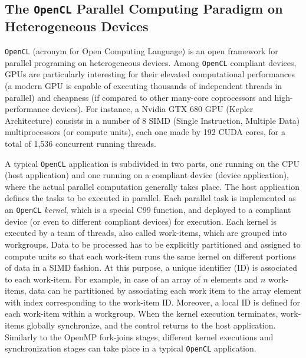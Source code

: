     \subsection{The \texttt{OpenCL} Parallel Computing Paradigm on Heterogeneous Devices}
    \texttt{OpenCL} (acronym for Open Computing Language) is an open framework for parallel programing on heterogeneous devices. Among \texttt{OpenCL} compliant devices, GPUs are particularly interesting for their elevated
    computational performances (a modern GPU is capable of executing
    thousands of independent threads in parallel) and cheapness (if
    compared to other many-core coprocessors and high-performance
    devices). For instance, a Nvidia GTX 680 GPU (Kepler Architecture)
    consists in a number of 8 SIMD (Single Instruction, Multiple Data)
    multiprocessors (or compute units), each one made by 192 CUDA
    cores, for a total of 1,536 concurrent running threads.
    
    A typical \texttt{OpenCL} application is subdivided in two parts, one
    running on the CPU (host application) and one running on a
    compliant device (device application), where the actual parallel
    computation generally takes place. The host application defines
    the tasks to be executed in parallel. Each parallel task is
    implemented as an \texttt{OpenCL} \emph{kernel}, which is a special C99
    function, and deployed to a compliant device (or even to different
    compliant devices) for execution. Each kernel is executed by a
    team of threads, also called work-items, which are grouped into
    workgroups. Data to be processed has to be explicitly partitioned
    and assigned to compute units so that each work-item runs the same
    kernel on different portions of data in a SIMD fashion. At this
    purpose, a unique identifier (ID) is associated to each
    work-item. For example, in case of an array of $n$ elements and
    $n$ work-items, data can be partitioned by associating each work
    item to the array element with index corresponding to the
    work-item ID. Moreover, a local ID is defined for each work-item
    within a workgroup. When the kernel execution terminates,
    work-items globally synchronize, and the control returns to the
    host application. Similarly to the OpenMP fork-joins stages,
    different kernel executions and synchronization stages can take
    place in a typical \texttt{OpenCL} application.
    
